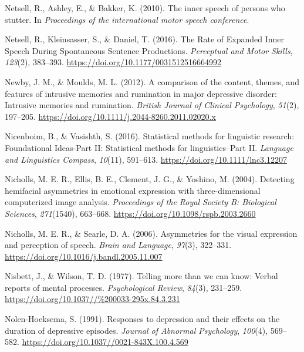\documentclass[a4paper,12pt,twoside,openright,oldfontcommands]{memoir}
\begin{document}
\leavevmode\hypertarget{ref-netsell_inner_2010}{}%
Netsell, R., Ashley, E., \& Bakker, K. (2010). The inner speech of persons who stutter. In \emph{Proceedings of the international motor speech conference}.

\leavevmode\hypertarget{ref-netsell_rate_2016}{}%
Netsell, R., Kleinsasser, S., \& Daniel, T. (2016). The Rate of Expanded Inner Speech During Spontaneous Sentence Productions. \emph{Perceptual and Motor Skills}, \emph{123}(2), 383--393. \url{https://doi.org/10.1177/0031512516664992}

\leavevmode\hypertarget{ref-newby_comparison_2012}{}%
Newby, J. M., \& Moulds, M. L. (2012). A comparison of the content, themes, and features of intrusive memories and rumination in major depressive disorder: Intrusive memories and rumination. \emph{British Journal of Clinical Psychology}, \emph{51}(2), 197--205. \url{https://doi.org/10.1111/j.2044-8260.2011.02020.x}

\leavevmode\hypertarget{ref-nicenboim_statistical_2016}{}%
Nicenboim, B., \& Vasishth, S. (2016). Statistical methods for linguistic research: Foundational Ideas-Part II: Statistical methods for linguistics--Part II. \emph{Language and Linguistics Compass}, \emph{10}(11), 591--613. \url{https://doi.org/10.1111/lnc3.12207}

\leavevmode\hypertarget{ref-nicholls_detecting_2004}{}%
Nicholls, M. E. R., Ellis, B. E., Clement, J. G., \& Yoshino, M. (2004). Detecting hemifacial asymmetries in emotional expression with three-dimensional computerized image analysis. \emph{Proceedings of the Royal Society B: Biological Sciences}, \emph{271}(1540), 663--668. \url{https://doi.org/10.1098/rspb.2003.2660}

\leavevmode\hypertarget{ref-nicholls_asymmetries_2006}{}%
Nicholls, M. E. R., \& Searle, D. A. (2006). Asymmetries for the visual expression and perception of speech. \emph{Brain and Language}, \emph{97}(3), 322--331. \url{https://doi.org/10.1016/j.bandl.2005.11.007}

\leavevmode\hypertarget{ref-nisbett_telling_1977}{}%
Nisbett, J., \& Wilson, T. D. (1977). Telling more than we can know: Verbal reports of mental processes. \emph{Psychological Review}, \emph{84}(3), 231--259. \url{https://doi.org/10.1037//\%200033-295x.84.3.231}

\leavevmode\hypertarget{ref-nolen-hoeksema_responses_1991}{}%
Nolen-Hoeksema, S. (1991). Responses to depression and their effects on the duration of depressive episodes. \emph{Journal of Abnormal Psychology}, \emph{100}(4), 569--582. \url{https://doi.org/10.1037//0021-843X.100.4.569}
\end{document}
